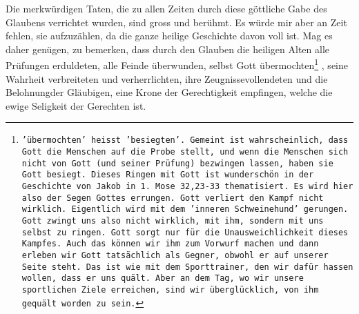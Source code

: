 \medskip

Die merkwürdigen Taten, die zu allen Zeiten durch diese göttliche Gabe des
Glaubens verrichtet wurden, sind gross und berühmt. Es würde mir aber an Zeit
fehlen, sie aufzuzählen, da die ganze heilige Geschichte davon voll ist. Mag es
daher genügen, zu bemerken, dass durch den Glauben die heiligen Alten alle
Prüfungen erduldeten, alle Feinde überwunden, selbst Gott
übermochten\footnote{\texttt{'übermochten' heisst 'besiegten'. Gemeint ist
wahrscheinlich, dass Gott die Menschen auf die Probe stellt, und wenn die Menschen
sich nicht von Gott (und seiner Prüfung) bezwingen lassen, haben sie Gott
besiegt. Dieses Ringen mit Gott ist wunderschön in der Geschichte von Jakob in
1. Mose 32,23-33 thematisiert. Es wird hier also der Segen Gottes
errungen. Gott verliert den Kampf nicht wirklich. Eigentlich wird
mit dem 'inneren Schweinehund' gerungen. Gott zwingt uns also nicht
wirklich, mit ihm, sondern mit uns selbst zu ringen. Gott sorgt
nur für die Unausweichlichkeit dieses Kampfes. Auch das können
wir ihm zum Vorwurf machen und dann erleben wir Gott tatsächlich
als Gegner, obwohl er auf unserer Seite steht. Das ist wie mit
dem Sporttrainer, den wir dafür hassen wollen, dass er uns quält.
Aber an dem Tag, wo wir unsere sportlichen Ziele erreichen, sind
wir überglücklich, von ihm gequält worden zu sein.}}
, seine
Wahrheit verbreiteten und verherrlichten, ihre
Zeugnissevollendeten und die
Belohnungder Gläubigen, eine Krone der
Gerechtigkeit empfingen, welche die
ewige Seligkeit der Gerechten ist.







